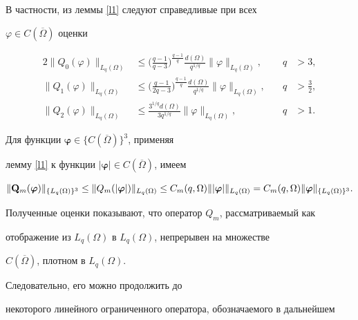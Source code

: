 В частности, из леммы \ref{l1} следуют справедливые при всех


$\varphi\in C(\overline{\Omega})$ оценки


\begin{alignat*}{2}


\|Q_0(\varphi)\|_{L_q(\Omega)}&\leq\bigg(\frac{q-1}{q-3}\bigg)


^{\frac{q-1}{q}}\frac{d(\Omega)}{q^{1/q}}


\|\varphi\|_{L_q(\Omega)}, &\quad q&>3,\\


%


\|Q_1(\varphi)\|_{L_q(\Omega)}&\leq\bigg(\frac{q-1}{2q-3}\bigg)


^{\frac{q-1}{q}}\frac{d(\Omega)}{q^{1/q}}


\|\varphi\|_{L_q(\Omega)}, &\quad q&>\frac{3}{2},\\


%


\|Q_2(\varphi)\|_{L_q(\Omega)}&\leq\frac{3^{1/q}


d(\Omega)}{3q^{1/q}}


\|\varphi\|_{L_q(\Omega)}, &\quad q&>1.


\end{alignat*}


Для функции $\boldsymbol{\varphi}\in\{ C(\overline{\Omega})\}^3$, применяя


лемму \ref{l1} к функции ${|\boldsymbol{\varphi}|\in C(\overline{\Omega})}$, имеем


$$


\|\bold{Q}_m(\boldsymbol{\varphi})\|_{\{L_q(\Omega)\}^3}\leq


\|Q_m(|\boldsymbol{\varphi}|)\|_{L_q(\Omega)}\leq C_m(q,\Omega)


\||\boldsymbol{\varphi}|\|_{L_q(\Omega)}=C_m(q,\Omega)


\|\boldsymbol{\varphi}\|_{\{L_q(\Omega)\}^3}.


$$





Полученные оценки показывают, что оператор $Q_m$, рассматриваемый как


отображение из $L_q(\Omega)$ в $L_q(\Omega)$, непрерывен на множестве


$C(\overline{\Omega})$, плотном в $L_q(\Omega)$.


Следовательно, его можно продолжить до


некоторого линейного ограниченного оператора, обозначаемого в дальнейшем


